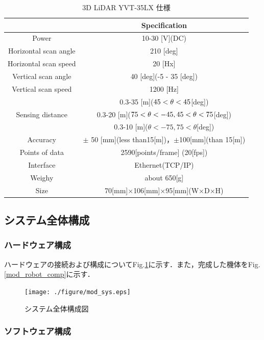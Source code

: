\begin{table}[hb]
	\centering
	\caption{3D LiDAR YVT-35LX 仕様}
	\begin{tabular}{|c|c|} \hline
	& Specification \\ \hline
	Power 				& 10-30 [V](DC) \\ \hline
	Horizontal scan angle	& 210 [deg] \\ \hline
	Horizontal scan speed	& 20 [Hx]	\\ \hline
	Vertical scan angle		& 40 [deg](-5 - 35 [deg]) \\ \hline
	Vertical scan speed		& 1200 [Hz]	\\ \hline
						& 0.3-35 [m]($\-45<\theta < 45 $[deg]) \\
	Sensing distance	& 0.3-20 [m]($\-75 < \theta < -45,45<\theta<75$[deg]) \\
 						& 0.3-10 [m]($\theta< -75,75< \theta$[deg]) \\ \hline
	Accuracy			& $\pm$ 50 [mm](less than15[m])，$\pm$100[mm](than 15[m])\\ \hline
	Points of data		& 2590[points/frame] (20[fps])	\\ \hline
	Interface			& Ethernet(TCP/IP)				\\ \hline
	Weighy				& about 650[g]	\\ \hline
	Size				& 70[mm]$\times$106[mm]$\times$95[mm](W$\times$D$\times$H)\\ \hline
	\end{tabular}
	\label{yvt_spec}
\end{table}
\newpage
\subsection{システム全体構成}
\subsubsection{ハードウェア構成}
\par ハードウェアの接続および構成についてFig.\ref{mod_sys_fig}に示す．また，完成した機体をFig.\ref{mod_robot_comp}に示す．

\begin{figure}[b]
	\centering
	\texttt{[image: ./figure/mod\_sys.eps]}
	\caption{システム全体構成図}
	\label{mod_sys_fig}
\end{figure}

\subsubsection{ソフトウェア構成}
\par 